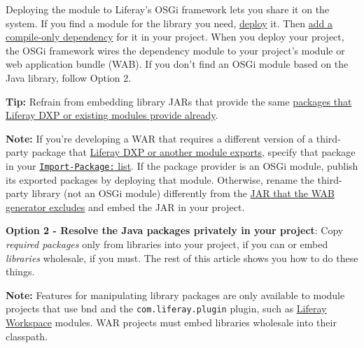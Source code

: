 Deploying the module to Liferay's OSGi framework lets you share it on
the system. If you find a module for the library you need,
\href{/docs/7-2/reference/-/knowledge_base/r/deploying-a-project}{deploy}
it. Then
\href{/docs/7-2/customization/-/knowledge_base/c/specifying-dependencies}{add
a compile-only dependency} for it in your project. When you deploy your
project, the OSGi framework wires the dependency module to your
project's module or web application bundle (WAB). If you don't find an
OSGi module based on the Java library, follow Option 2.

\noindent\hrulefill

\textbf{Tip:} Refrain from embedding library JARs that provide the same
\href{/docs/7-2/reference/-/knowledge_base/r/third-party-packages-portal-exports}{packages
that Liferay DXP or existing modules provide already}.

\noindent\hrulefill

\noindent\hrulefill

\textbf{Note:} If you're developing a WAR that requires a different
version of a third-party package that
\href{/docs/7-2/reference/-/knowledge_base/r/third-party-packages-portal-exports}{Liferay
DXP or another module exports}, specify that package in your
\href{/docs/7-2/customization/-/knowledge_base/c/importing-packages}{\texttt{Import-Package:}
list}. If the package provider is an OSGi module, publish its exported
packages by deploying that module. Otherwise, rename the third-party
library (not an OSGi module) differently from the
\href{/docs/7-2/customization/-/knowledge_base/c/understanding-excluded-jars}{JAR
that the WAB generator excludes} and embed the JAR in your project.

\noindent\hrulefill

\textbf{Option 2 - Resolve the Java packages privately in your project}:
Copy \emph{required packages} only from libraries into your project, if
you can or embed \emph{libraries} wholesale, if you must. The rest of
this article shows you how to do these things.

\noindent\hrulefill

\textbf{Note:} Features for manipulating library packages are only
available to module projects that use bnd and the
\texttt{com.liferay.plugin} plugin, such as
\href{/docs/7-2/reference/-/knowledge_base/r/liferay-workspace}{Liferay
Workspace} modules. WAR projects must embed libraries wholesale into
their classpath.

\noindent\hrulefill

